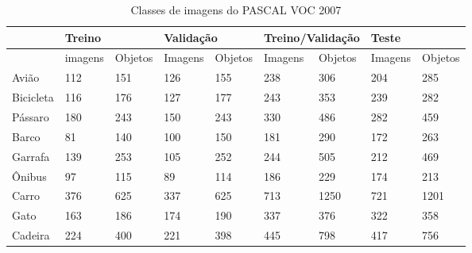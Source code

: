 \begin{table}[H]
	\centering
	\footnotesize
	\setlength{\abovecaptionskip}{0pt}
	\setlength{\belowcaptionskip}{0pt}
	\caption[Pascal VOC 2007]{Classes de imagens do PASCAL VOC 2007}
	\label{tab:voc2007}
	\begin{tabular}{l|l|l|l|l|l|l|ll}
		& \multicolumn{2}{l|}{Treino} & \multicolumn{2}{l|}{Validação} & \multicolumn{2}{l|}{Treino/Validação} & \multicolumn{2}{l}{Teste}              \\ \hline
		& imagens      & Objetos      & Imagens        & Objetos       & Imagens           & Objetos           & \multicolumn{1}{l|}{Imagens} & Objetos \\ \hline
		Avião          & 112          & 151          & 126            & 155           & 238               & 306               & \multicolumn{1}{l|}{204}     & 285     \\
		Bicicleta      & 116          & 176          & 127            & 177           & 243               & 353               & \multicolumn{1}{l|}{239}     & 282     \\
		Pássaro        & 180          & 243          & 150            & 243           & 330               & 486               & \multicolumn{1}{l|}{282}     & 459     \\
		Barco          & 81           & 140          & 100            & 150           & 181               & 290               & \multicolumn{1}{l|}{172}     & 263     \\
		Garrafa        & 139          & 253          & 105            & 252           & 244               & 505               & \multicolumn{1}{l|}{212}     & 469     \\
		Ônibus         & 97           & 115          & 89             & 114           & 186               & 229               & \multicolumn{1}{l|}{174}     & 213     \\
		Carro          & 376          & 625          & 337            & 625           & 713               & 1250              & \multicolumn{1}{l|}{721}     & 1201    \\
		Gato           & 163          & 186          & 174            & 190           & 337               & 376               & \multicolumn{1}{l|}{322}     & 358     \\
		Cadeira        & 224          & 400          & 221            & 398           & 445               & 798               & \multicolumn{1}{l|}{417}     & 756     \\

\end{tabular}
\end{table}
